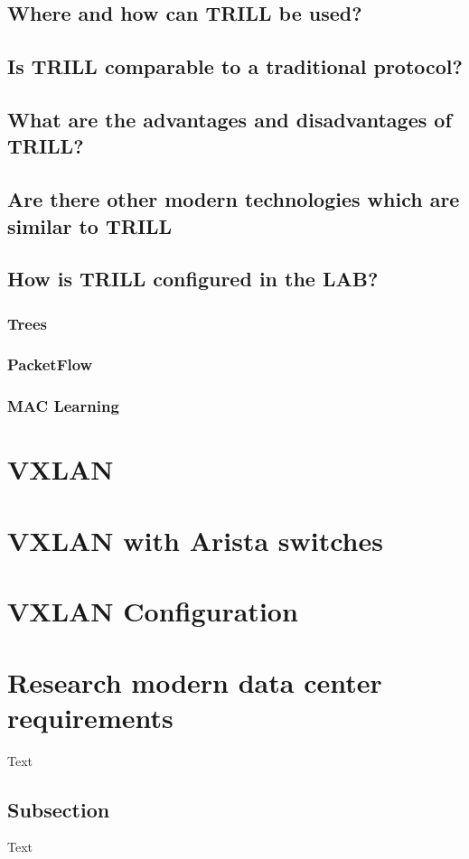 \documentclass[a4,12pt]{scrartcl}
\begin{document}
\subsection{Where and how can TRILL be used?}
\subsection{Is TRILL comparable to a traditional protocol?}
\subsection{What are the advantages and disadvantages of TRILL?}
\subsection{Are there other modern technologies which are similar to TRILL}
\subsection{How is TRILL configured in the LAB?}
\subsubsection{Trees}
\subsubsection{PacketFlow}
\subsubsection{MAC Learning}
\section{VXLAN}
\section{VXLAN with Arista switches}
\section{VXLAN Configuration}
\section{Research modern data center requirements}
Text


\subsection{Subsection}
Text
\end{document}
